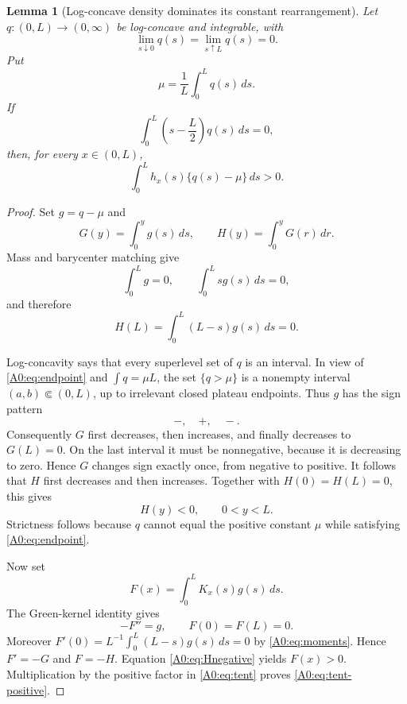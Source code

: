 \documentclass[11pt]{amsart}
\numberwithin{equation}{section}
\newtheorem{lemma}[theorem]{Lemma}
\theoremstyle{definition}
\theoremstyle{remark}
\begin{document}
\begin{lemma}[Log-concave density dominates its constant rearrangement]
\label{A0:lem:tent}
Let \(q:(0,L)\to(0,\infty)\) be log-concave and integrable, with
\begin{equation}\label{A0:eq:endpoint}
 \lim_{s\downarrow0}q(s)=\lim_{s\uparrow L}q(s)=0.
\end{equation}
Put
\begin{equation}
 \mu=\frac1L\int_0^Lq(s)\,ds.
\end{equation}
If
\begin{equation}\label{A0:eq:barycenter}
 \int_0^L\left(s-\frac L2\right)q(s)\,ds=0,
\end{equation}
then, for every \(x\in(0,L)\),
\begin{equation}\label{A0:eq:tent-positive}
 \boxed{\int_0^Lh_x(s)\{q(s)-\mu\}\,ds>0.}
\end{equation}
\end{lemma}

\begin{proof}
Set \(g=q-\mu\) and
\begin{equation}
 G(y)=\int_0^yg(s)\,ds,\qquad
 H(y)=\int_0^yG(r)\,dr.
\end{equation}
Mass and barycenter matching give
\begin{equation}\label{A0:eq:moments}
 \int_0^Lg=0,\qquad \int_0^Lsg(s)\,ds=0,
\end{equation}
and therefore
\begin{equation}\label{A0:eq:Hend}
 H(L)=\int_0^L(L-s)g(s)\,ds=0.
\end{equation}

Log-concavity says that every superlevel set of \(q\) is an interval.
In view of \eqref{A0:eq:endpoint} and \(\int q=\mu L\), the set
\(\{q>\mu\}\) is a nonempty interval \((a,b)\Subset(0,L)\), up to
irrelevant closed plateau endpoints.  Thus \(g\) has the sign pattern
\[
 -,\quad +,\quad -.
\]
Consequently \(G\) first decreases, then increases, and finally decreases
to \(G(L)=0\).  On the last interval it must be nonnegative, because it is
decreasing to zero.  Hence \(G\) changes sign exactly once, from negative
to positive.  It follows that \(H\) first decreases and then increases.
Together with \(H(0)=H(L)=0\), this gives
\begin{equation}\label{A0:eq:Hnegative}
 H(y)<0,\qquad 0<y<L.
\end{equation}
Strictness follows because \(q\) cannot equal the positive constant
\(\mu\) while satisfying \eqref{A0:eq:endpoint}.

Now set
\[
 F(x)=\int_0^LK_x(s)g(s)\,ds.
\]
The Green-kernel identity gives
\[
 -F''=g,\qquad F(0)=F(L)=0.
\]
Moreover \(F'(0)=L^{-1}\int_0^L(L-s)g(s)\,ds=0\) by
\eqref{A0:eq:moments}.  Hence \(F'=-G\) and \(F=-H\).  Equation
\eqref{A0:eq:Hnegative} yields \(F(x)>0\).  Multiplication by the positive
factor in \eqref{A0:eq:tent} proves \eqref{A0:eq:tent-positive}.
\end{proof}
\end{document}
